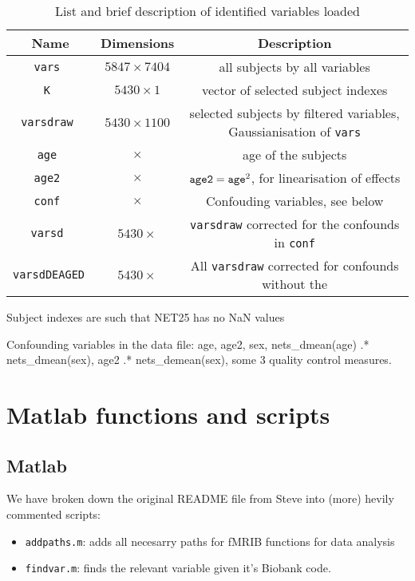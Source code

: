 \documentclass{article}
\begin{document}
\begin{table}
  \centering
  \caption{List and brief description of identified variables loaded}
  \begin{tabular}{ccc}
    \toprule
    \bf Name & \bf Dimensions & \bf Description \\
    \midrule
    \tt vars     &$5847 \times 7404$& all subjects by all variables\\
    \tt K        &$5430 \times 1   $& vector of selected subject indexes\\
    \tt varsdraw &$5430 \times 1100$& selected subjects by filtered variables, Gaussianisation of {\tt vars}\\
    \tt age      &$ \times $& age of the subjects\\
    \tt age2     &$ \times $& $\text{\tt age2} = \text{\tt age}^2$, for linearisation of effects\\
    \tt conf     &$ \times $& Confouding variables, see below \\
    \tt varsd    &$5430 \times $& {\tt varsdraw} corrected for the confounds in {\tt conf} \\
    \tt varsdDEAGED &$ 5430 \times $& All {\tt varsdraw} corrected for confounds without the \\
    \bottomrule
  \end{tabular}
  \label{tab:data-vars}
\end{table}


Subject indexes are such that NET25 has no NaN values

Confounding variables in the data file: age, age2, sex, nets\_dmean(age) .* nets\_dmean(sex), age2 .* nets\_demean(sex), some 3 quality control measures.

\section{Matlab functions and scripts\label{sec:matlab}}

\subsection{Matlab}

We have broken down the original README file from Steve into (more) hevily commented scripts:
\begin{itemize}
\item {\tt addpaths.m}: adds all necesarry paths for fMRIB functions for data analysis
  \item {\tt findvar.m}: finds the relevant variable given it's Biobank code.
\end{itemize}
\end{document}
